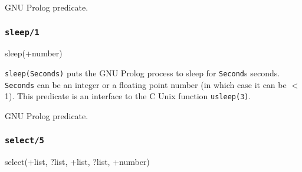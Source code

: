 \Portability

GNU Prolog predicate.

\subsubsection{\texttt{sleep/1}}

\begin{TemplatesOneCol}
sleep(+number)

\end{TemplatesOneCol}

\Description

\texttt{sleep(Seconds)} puts the GNU Prolog process to sleep for
\texttt{Second}s seconds. \texttt{Seconds} can be an integer or a floating
point number (in which case it can be $<$ 1). This predicate is an interface
to the C Unix function \texttt{usleep(3)}.

\begin{PlErrors}




\end{PlErrors}

\Portability

GNU Prolog predicate.

\subsubsection{\texttt{select/5}}
\label{select/5}

\begin{TemplatesOneCol}
select(+list, ?list, +list, ?list, +number)

\end{TemplatesOneCol}

\Description


